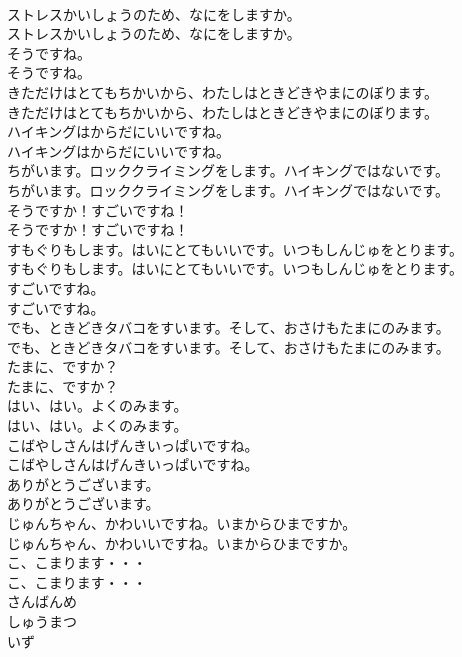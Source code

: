 \documentclass[8pt]{extreport}
\begin{document}
\begin{CJK}{UTF8}{min}
\\	ストレスかいしょうのため、なにをしますか。	
\\	ストレスかいしょうのため、なにをしますか。 
\\	そうですね。	
\\	そうですね。 
\\	きただけはとてもちかいから、わたしはときどきやまにのぼります。	
\\	きただけはとてもちかいから、わたしはときどきやまにのぼります。 
\\	ハイキングはからだにいいですね。	
\\	ハイキングはからだにいいですね。 
\\	ちがいます。ロッククライミングをします。ハイキングではないです。	
\\	ちがいます。ロッククライミングをします。ハイキングではないです。 
\\	そうですか！すごいですね！	
\\	そうですか！すごいですね！ 
\\	すもぐりもします。はいにとてもいいです。いつもしんじゅをとります。	
\\	すもぐりもします。はいにとてもいいです。いつもしんじゅをとります。 
\\	すごいですね。	
\\	すごいですね。 
\\	でも、ときどきタバコをすいます。そして、おさけもたまにのみます。	
\\	でも、ときどきタバコをすいます。そして、おさけもたまにのみます。 
\\	たまに、ですか？	
\\	たまに、ですか？ 
\\	はい、はい。よくのみます。	
\\	はい、はい。よくのみます。 
\\	こばやしさんはげんきいっぱいですね。	
\\	こばやしさんはげんきいっぱいですね。 
\\	ありがとうございます。	
\\	ありがとうございます。 
\\	じゅんちゃん、かわいいですね。いまからひまですか。	
\\	じゅんちゃん、かわいいですね。いまからひまですか。 
\\	こ、こまります・・・	
\\	こ、こまります・・・ 
\\	さんばんめ
\\	しゅうまつ
\\	いず

\end{CJK}
\end{document}
